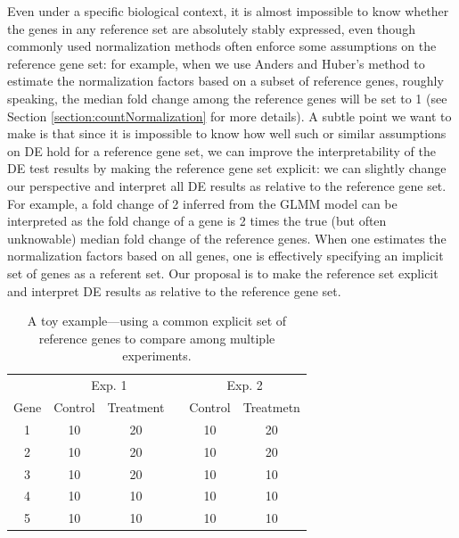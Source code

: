 \documentclass[letterpaper,12pt]{article}
\begin{document}

Even under a specific biological context,  it is almost impossible to know
whether the genes in any reference set are absolutely stably expressed, even
though commonly used normalization methods often enforce some assumptions on
the reference gene set: for example, when we use Anders and Huber's
method to estimate the normalization factors based on a subset of reference
genes, roughly speaking, the median fold change among the reference genes will
be set to 1 (see Section \ref{section:countNormalization} for more details). A
subtle point we want to make is that since it is impossible to know how well
such or similar assumptions on DE hold for a reference gene set,
we can improve the interpretability of the DE test results by making the
reference gene set explicit:  we can slightly change our perspective and
interpret all DE results as relative to the reference gene set.  
For example, a fold change of 2 inferred from the GLMM model can be
interpreted as the fold change of a gene is 2 times the true (but often
unknowable) median fold change of the reference genes.  
When one estimates the normalization factors based on all genes, one is
effectively specifying an implicit set of genes as a referent set.  Our
proposal is to make the reference set explicit and interpret DE results as
relative to the reference gene set.


\begin{center}
    \begin{table}\centering
	\caption{A toy example---using a common explicit set of reference genes  to compare among multiple experiments.}\label{table:reference}
	\begin{tabular}{cccccc} \hline
	    &  \multicolumn{2}{c}{Exp. 1} & & \multicolumn{2}{c}{Exp. 2} \\
	    \cline{2-3}  \cline{5-6}
	    Gene  & Control & Treatment & & Control & Treatmetn \\
	    \hline
	    1     & 10       & 20    &   & 10    &20   \\
	    2     & 10       & 20    &   & 10    &20   \\
	    3     & 10       & 20    &   & 10    &10   \\
	    4     & 10       & 10    &   & 10    &10   \\ 
	    5     & 10       & 10    &   & 10    &10   \\  
	    \hline
	\end{tabular}
    \end{table}
\end{center}
\end{document}
